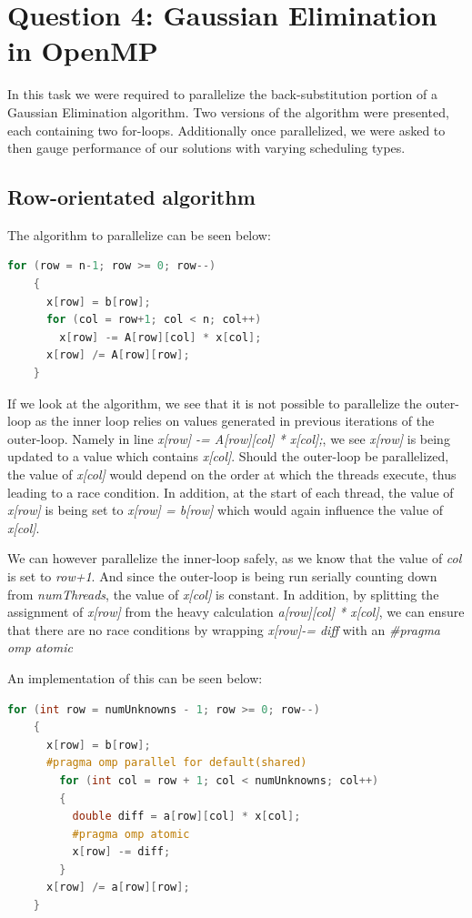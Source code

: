 \section{Question 4: Gaussian Elimination in OpenMP}

In this task we were required to parallelize the back-substitution portion of a Gaussian Elimination algorithm. 
Two versions of the algorithm were presented, each containing two for-loops. 
Additionally once parallelized, we were asked to then gauge performance of our solutions with varying scheduling types. 

  \subsection{Row-orientated algorithm}
  The algorithm to parallelize can be seen below:
  \begin{lstlisting}[language=C++]
    for (row = n-1; row >= 0; row--) 
    {
      x[row] = b[row];
      for (col = row+1; col < n; col++)
        x[row] -= A[row][col] * x[col];
      x[row] /= A[row][row];
    }
  \end{lstlisting}

  If we look at the algorithm, we see that it is not possible to parallelize the outer-loop as the inner loop relies on values generated in 
  previous iterations of the outer-loop. 
  Namely in line \textit{x[row] -= A[row][col] * x[col];}, we see \textit{x[row]} is being updated to a value which contains \textit{x[col]}. 
  Should the outer-loop be parallelized, the value of \textit{x[col]} would depend on the order at which the threads execute, thus leading to a race condition. 
  In addition, at the start of each thread, the value of \textit{x[row]} is being set to \textit{x[row] = b[row]} which would again influence the value of \textit{x[col]}.
  
  
  We can however parallelize the inner-loop safely, as we know that the value of \textit{col} is set to \textit{row+1}. And since the outer-loop is being run 
  serially counting down from \textit{numThreads}, the value of \textit{x[col]} is constant.   
  In addition, by splitting the assignment of \textit{x[row]} from the heavy calculation \textit{a[row][col] * x[col]}, we can ensure that there are no race conditions by wrapping 
  \textit{x[row]-= diff} with an \textit{#pragma omp atomic}

  An implementation of this can be seen below:
  \begin{lstlisting}[language=C++]
    for (int row = numUnknowns - 1; row >= 0; row--)
    {
      x[row] = b[row];
      #pragma omp parallel for default(shared)
        for (int col = row + 1; col < numUnknowns; col++)
        {
          double diff = a[row][col] * x[col];
          #pragma omp atomic
          x[row] -= diff;
        }
      x[row] /= a[row][row];
    }
  \end{lstlisting}
  
